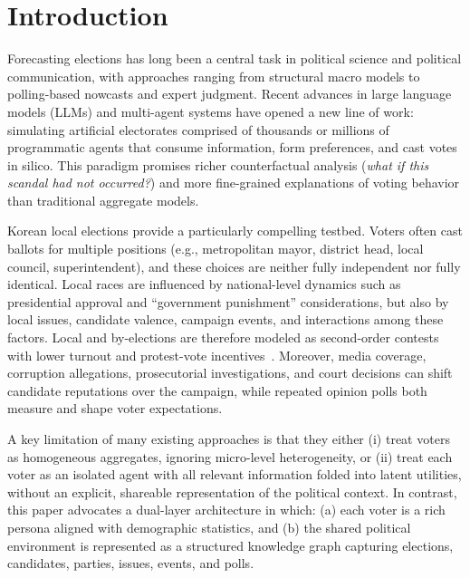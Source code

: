 \documentclass[11pt]{article}
\begin{document}
\begin{abstract}
MAE for $1/3$) as a calibration trajectory and introduces the counterfactual inference protocol rather than claiming a successful 2026 election forecast.
\end{abstract}

\section{Introduction}

Forecasting elections has long been a central task in political science and political communication, with approaches ranging from structural macro models to polling-based nowcasts and expert judgment. Recent advances in large language models (LLMs) and multi-agent systems have opened a new line of work: simulating artificial electorates comprised of thousands or millions of programmatic agents that consume information, form preferences, and cast votes in silico. This paradigm promises richer counterfactual analysis (\emph{what if this scandal had not occurred?}) and more fine-grained explanations of voting behavior than traditional aggregate models.

Korean local elections provide a particularly compelling testbed. Voters often cast ballots for multiple positions (e.g., metropolitan mayor, district head, local council, superintendent), and these choices are neither fully independent nor fully identical. Local races are influenced by national-level dynamics such as presidential approval and ``government punishment'' considerations, but also by local issues, candidate valence, campaign events, and interactions among these factors. Local and by-elections are therefore modeled as second-order contests with lower turnout and protest-vote incentives~\cite{reif1980secondorder}. Moreover, media coverage, corruption allegations, prosecutorial investigations, and court decisions can shift candidate reputations over the campaign, while repeated opinion polls both measure and shape voter expectations.

A key limitation of many existing approaches is that they either (i) treat voters as homogeneous aggregates, ignoring micro-level heterogeneity, or (ii) treat each voter as an isolated agent with all relevant information folded into latent utilities, without an explicit, shareable representation of the political context. In contrast, this paper advocates a dual-layer architecture in which: (a) each voter is a rich persona aligned with demographic statistics, and (b) the shared political environment is represented as a structured knowledge graph capturing elections, candidates, parties, issues, events, and polls.
\end{document}
